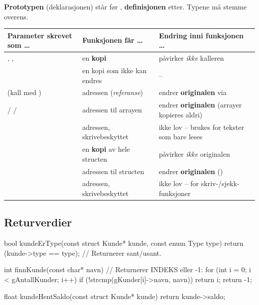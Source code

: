 

\textbf{Prototypen} (deklarasjonen) står før , \textbf{definisjonen} etter. Typene må stemme overens.

\begin{center}
\begin{tabular}{@{}L{4.8cm}L{4.6cm}L{6.2cm}@{}}
\toprule
\textbf{Parameter skrevet som \dots} & \textbf{Funksjonen får \dots} & \textbf{Endring inni funksjonen \dots} \\
\midrule
{}, ,  & en \textbf{kopi} & påvirker \emph{ikke} kalleren \\
 & en kopi som ikke kan endres & -- \\
 (kall med ) & adressen (\emph{referanse}) & endrer \textbf{originalen} via  \\
 /  /  & adressen til arrayen & endrer \textbf{originalen} (arrayer kopieres aldri) \\
 & adressen, skrivebeskyttet & ikke lov -- brukes for tekster som bare leses \\
 & en \textbf{kopi} av hele structen & påvirker \emph{ikke} originalen \\
 & adressen til structen & endrer \textbf{originalen} () \\
 & adressen, skrivebeskyttet & ikke lov -- for skriv-/sjekk-funksjoner \\
\bottomrule
\end{tabular}
\end{center}

\subsection{Returverdier}
\begin{kode}
bool kundeErType(const struct Kunde* kunde, const enum Type type)  {
  return (kunde->type == type);              //  Returnerer sant/usant.
}

int finnKunde(const char* navn)  {           //  Returnerer INDEKS eller -1:
  for (int i = 0;  i < gAntallKunder;  i++)
      if (!strcmp(gKunder[i]->navn, navn))  return i;
  return -1;
}

float kundeHentSaldo(const struct Kunde* kunde)  {  return kunde->saldo;  }
\end{kode}

